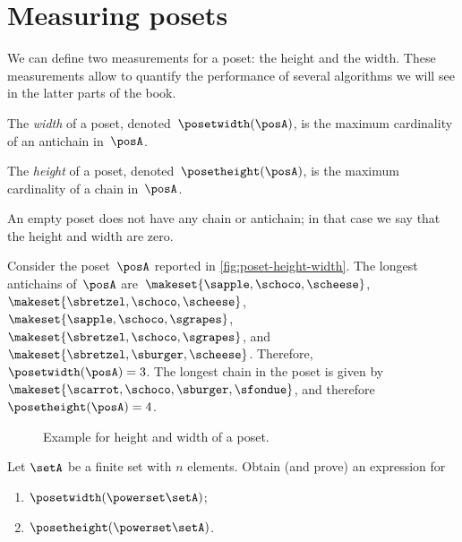 \section{Measuring posets}
We can define two measurements for a poset: the height and the width.
These measurements allow to quantify the performance of several algorithms we will see in the latter parts of the book.
\begin{definition}
    \label{def:poset-width}
    The \emph{width} of a poset, denoted~$\posetwidth(\posA)$, is the maximum cardinality of an antichain in~$\posA$.
\end{definition}

\begin{definition}
    \label{def:poset-height}
    The \emph{height} of a poset, denoted~$\posetheight(\posA)$, is the maximum cardinality of a chain in~$\posA$.
\end{definition}

An empty poset does not have any chain or antichain; in that case we say that the height and width are zero.

\begin{example}
    Consider the poset~$\posA$ reported in \cref{fig:poset-height-width}.
    The longest antichains of~$\posA$ are~$\makeset{\sapple, \schoco, \scheese}$,~$\makeset{\sbretzel, \schoco, \scheese}$,~$\makeset{\sapple, \schoco, \sgrapes}$,~$\makeset{\sbretzel, \schoco, \sgrapes}$, and~$\makeset{\sbretzel, \sburger, \scheese}$.
    Therefore,~$\posetwidth(\posA)=3$.
    The longest chain in the poset is given by~$\makeset{\scarrot,\schoco,\sburger,\sfondue}$, and therefore~$\posetheight(\posA)=4$.
\end{example}

\begin{figure*}[h]
    \caption{Example for height and width of a poset.
    }
\end{figure*}

\vfill
\begin{gradedexercise}
    Let $\setA$ be a finite set with $n$ elements.
    Obtain (and prove) an expression for
    \begin{enumerate}
        \item $\posetwidth(\powerset  \setA)$;
        \item $\posetheight(\powerset \setA)$.
    \end{enumerate}
\end{gradedexercise}

